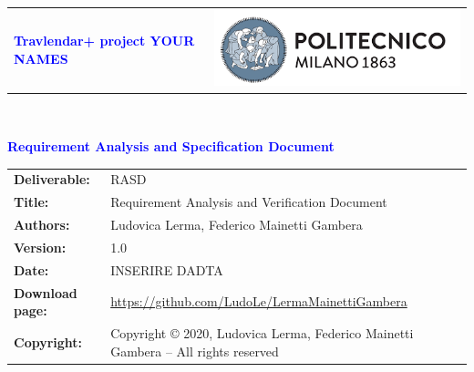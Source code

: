 


        \begin{titlepage}
                {\begin{table}[t!]
                \centering
                \begin{tabu} to \textwidth { X[1.3,r,p] X[1.7,l,p] }
                \textcolor{Blue}
                {\textbf{\small{Travlendar+ project YOUR NAMES}}} & \includegraphics[scale=0.5]{Images/PolimiLogo}
                \end{tabu}
                \end{table}}~\\ [7cm]

                \begin{flushleft}
                {\textcolor{Blue}{\textbf{\Huge{Requirement Analysis and Specification Document}}}} \\ [1cm]
                \end{flushleft}
        \end{titlepage}

        \begin{table}[h!]
                \begin{tabu} to \textwidth { X[0.3,r,p] X[0.7,l,p] }
                \hline
                
                \textbf{Deliverable:} & RASD\\
                \textbf{Title:} & Requirement Analysis and Verification Document \\
                \textbf{Authors:} & Ludovica Lerma, Federico Mainetti Gambera \\
                \textbf{Version:} & 1.0 \\ 
                \textbf{Date:} & INSERIRE DADTA \\
                \textbf{Download page:} & \url{https://github.com/LudoLe/LermaMainettiGambera}\\
                \textbf{Copyright:} & Copyright © 2020, Ludovica Lerma, Federico Mainetti Gambera – All rights reserved \\
                \hline
                \end{tabu}
        \end{table}

